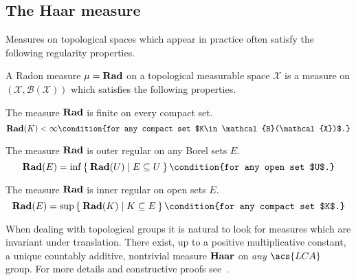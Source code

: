 \subsection{The Haar measure}
Measures on topological spaces which appear in practice often satisfy the following regularity properties.
\begin{definition}
A Radon measure $\mu=\mathbf{Rad}$ on a topological measurable space $\mathcal{X}$ is a measure on
$(\mathcal{X}, \mathcal{B}(\mathcal{X}))$ which satisfies the following properties.
\begin{propenum}
\item The measure $\mathbf{Rad}$ is finite on every compact set.
\begin{dmath*}
\Radon(K) < \infty\condition{for any compact set $K\in\mathcal{B}(\mathcal{X})$.}
\end{dmath*}
\item The measure $\mathbf{Rad}$ is outer regular on any Borel sets $E$.
\begin{dmath*}
\Radon(E)=\inf \Set{\Radon(U) | E\subseteq U}\condition{for any open set $U$.}
\end{dmath*}
\item The measure $\mathbf{Rad}$ is inner regular on open sets $E$.
\begin{dmath*}
\Radon(E)=\sup\Set{\Radon(K) | K\subseteq E}\condition{for any compact set $K$.}
\end{dmath*}
\end{propenum}
\end{definition}

When dealing with topological groups it is natural to look for measures which
are invariant under translation. There exist, up to a positive multiplicative constant, a unique countably additive, nontrivial measure $\mathbf{Haar}$ on \emph{any} $\acs{LCA}$ group. For more details and constructive proofs see~\citet{alfsen1964simplified,folland1994course,conway2013course}.

